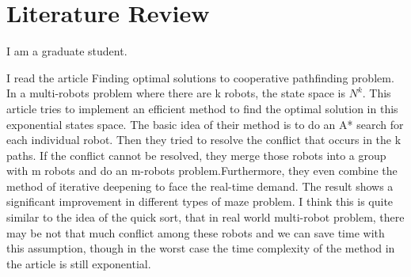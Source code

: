 \documentclass{article}
\begin{document}
\clearpage
\section{Literature Review}
\begin{flushleft}
I am a graduate student.

I read the article Finding optimal solutions to cooperative pathfinding problem. In a multi-robots problem where there are k robots, the state space is $N^k$. This article tries to implement an efficient method to find the optimal solution in this exponential states space. The basic idea of their method is to do an A* search for each individual robot. Then they tried to resolve the conflict that occurs in the k paths. If the conflict cannot be resolved, they merge those robots into a group with m robots and do an m-robots problem.Furthermore, they even combine the method of iterative deepening to face the real-time demand. The result shows a significant improvement in different types of maze problem. I think this is quite similar to the idea of the quick sort, that in real world multi-robot problem, there may be not that much conflict among these robots and we can save time with this assumption, though in the worst case the time complexity of the method in the article is still exponential.
\end{flushleft}
\end{document}
